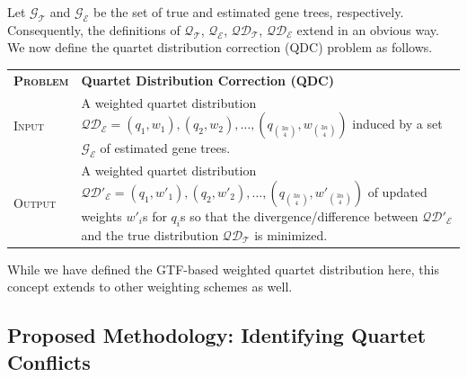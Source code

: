 \documentclass[runningheads]{llncs}
\begin{document}
Let $\mathcal{G_T}$ and $\mathcal{G_E}$ be the set of true and estimated gene trees, respectively. Consequently, the definitions of $\mathcal{Q_T}$, $\mathcal{Q_E}$, $\mathcal{QD_T}$, $\mathcal{QD_E}$ extend in an obvious way. %
We now define the quartet distribution correction (QDC) problem as follows.

\vspace{0.3cm}
\begin{tabular}{p{1.8cm}p{10cm}}
\textbf{\textsc{Problem}} &\textbf{Quartet Distribution Correction (QDC)}\\
\textsc{Input} & A weighted quartet distribution $\mathcal{QD_E} = (q_1,w_1), (q_2,w_2), \ldots, (q_{3n \choose 4},w_{3n \choose 4})$ induced by a set $\mathcal{G_E}$ of estimated gene trees. \\
\textsc{Output} & A weighted quartet distribution $\mathcal{QD'_E} = (q_1,w'_1), (q_2,w'_2), \ldots, (q_{3n \choose 4}, w'_{3n \choose 4})$ of updated weights $w'_i$s for $q_i$s so that the divergence/difference between $\mathcal{QD'_E}$ and the true distribution $\mathcal{QD_T}$ is minimized. %
\end{tabular}

While we have defined the GTF-based weighted quartet distribution here, this concept extends to other weighting schemes as well. %

\subsection{Proposed Methodology: Identifying Quartet Conflicts}
\label{sec:qt-conflict}
\end{document}
